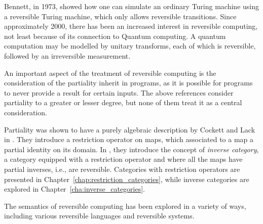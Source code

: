 Bennett, in 1973,  \cite{bennett:1973reverse} showed how one can simulate an ordinary Turing machine
using a reversible Turing machine, which only allows reversible transitions. Since approximately 2000, there has
been an increased interest in reversible computing, not least because of its connection to Quantum
computing. A quantum computation may be modelled by unitary
transforms\cite{neilsen2000:QuantumComputationAndInfo}, each of which is reversible, followed by an
irreversible measurement.

An important aspect of the treatment of reversible computing is the consideration of the partiality
inherit in programs, as it is possible for programs to never provide a result for certain inputs. The above
references consider partiality to a greater or lesser degree, but none of them treat it as a central
consideration.

Partiality was shown to have a purely algebraic description by Cockett and Lack in
\cite{cockett2002:restcategories1,cockettlack2003:restcategories2,cockettlack2004:restcategories3}. They
introduce a restriction  operator on maps, which associated to a map a partial identity on its
domain. In \cite{cockett2002:restcategories1}, they introduce the concept of \emph{inverse
  category}, a category equipped with a restriction operator and where all the maps have partial
inverses, i.e., are reversible. Categories with restriction operators are presented in
Chapter~\ref{chap:restriction_categories}, while inverse categories are explored in
Chapter~\ref{cha:inverse_categories}.

The semantics of reversible computing has been explored in a variety of ways, including various
reversible languages and reversible systems.


